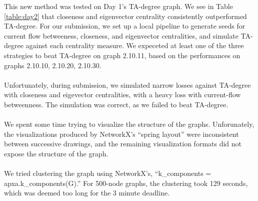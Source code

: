 \documentclass[letterpaper, 11pt]{article}
\begin{document}
This new method was tested on Day 1's TA-degree graph. We see in Table \ref{table:day2} that closeness and eigenvector centrality consistently outperformed TA-degree. For our submission, we set up a local pipeline to generate seeds for current flow betweeness, closeness, and eigenvector centralities, and simulate TA-degree against each centrality measure. We expeceted at least one of the three strategies to beat TA-degree on graph 2.10.11, based on the performances on graphs 2.10.10, 2.10.20, 2.10.30.
\\\\
Unfortunately, during submission, we simulated narrow losses against TA-degree with closeness and eigevector centralities, with a heavy loss with current-flow betweenness. The simulation was correct, as we failed to beat TA-degree.
\\\\
We spent some time trying to visualize the structure of the graphs. Unforunately, the visualizations produced by NetworkX's ``spring layout'' were inconsistent between successive drawings, and the remaining visualization formats did not expose the structure of the graph.
\\\\
We tried clustering the graph using NetworkX's, ``k\_components = apxa.k\_components(G).'' For 500-node graphs, the clustering took 129 seconds, which was deemed too long for the 3 minute deadline.
\end{document}
